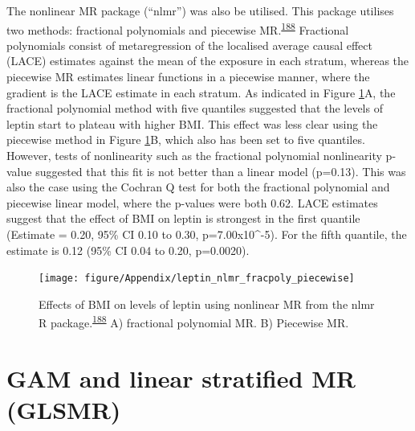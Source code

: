 \documentclass[11pt,twoside]{bristolthesis}
\begin{document}
The nonlinear MR package (``nlmr'') was also be utilised. This package utilises two methods: fractional polynomials and piecewise MR.\textsuperscript{\protect\hyperlink{ref-Staley2017}{188}} Fractional polynomials consist of metaregression of the localised average causal effect (LACE) estimates against the mean of the exposure in each stratum, whereas the piecewise MR estimates linear functions in a piecewise manner, where the gradient is the LACE estimate in each stratum. As indicated in Figure \ref{fig:leptin-nlmr}A, the fractional polynomial method with five quantiles suggested that the levels of leptin start to plateau with higher BMI. This effect was less clear using the piecewise method in Figure \ref{fig:leptin-nlmr}B, which also has been set to five quantiles. However, tests of nonlinearity such as the fractional polynomial nonlinearity p-value suggested that this fit is not better than a linear model (p=0.13). This was also the case using the Cochran Q test for both the fractional polynomial and piecewise linear model, where the p-values were both 0.62. LACE estimates suggest that the effect of BMI on leptin is strongest in the first quantile (Estimate = 0.20, 95\% CI 0.10 to 0.30, p=7.00x10\^{}-5). For the fifth quantile, the estimate is 0.12 (95\% CI 0.04 to 0.20, p=0.0020).



\begin{figure}
\texttt{[image: figure/Appendix/leptin\_nlmr\_fracpoly\_piecewise]} \caption[Effects of BMI on levels of leptin using nonlinear MR]{Effects of BMI on levels of leptin using nonlinear MR from the nlmr R package.\textsuperscript{\protect\hyperlink{ref-Staley2017}{188}} A) fractional polynomial MR. B) Piecewise MR.}\label{fig:leptin-nlmr}
\end{figure}
\hypertarget{gam-and-linear-stratified-mr-glsmr}{%
\section{GAM and linear stratified MR (GLSMR)}\label{gam-and-linear-stratified-mr-glsmr}}
\end{document}
